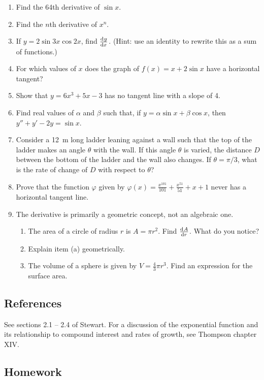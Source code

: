 \begin{enumerate}
  \item Find the 64th derivative of $ \sin x $.
  \item Find the $ n$th derivative of $ x^n $.
  \item If $ y = 2\sin 3x \cos 2x $, find $ \od{y}{x} $. (Hint: use an identity to rewrite this as a sum of functions.)
  \item For which values of $ x $ does the graph of $ f(x) = x + 2\sin x $ have a horizontal tangent?
  \item Show that $ y = 6x^3 + 5x - 3 $ has no tangent line with a slope of 4.
  \item Find real values of $ \alpha $ and $ \beta $ such that, if $ y = \alpha \sin x + \beta \cos x $,
        then $ y'' + y' -2y = \sin x $.
  \item Consider a \SI{12}{\metre} long ladder leaning against a wall such that the top of the ladder makes an
        angle $ \theta $ with the wall. If this angle $ \theta $ is varied, the distance $ D $ between the bottom
        of the ladder and the wall also changes. If $ \theta = \pi/3 $, what is the rate of change of $ D $ with
        respect to $ \theta $?
  \item Prove that the function $ \varphi $ given by $ \varphi(x) = \frac{x^{101}}{101} + \frac{x^{51}}{51} + x + 1 $
        never has a horizontal tangent line.
  \item The derivative is primarily a geometric concept, not an algebraic one.
    \begin{enumerate}
      \item The area of a circle of radius $ r $ is $ A = \pi r^2 $. Find $ \od{A}{r} $. What do you notice?
      \item Explain item (a) geometrically.
      \item The volume of a sphere is given by $ V = \frac{4}{3} \pi r^3 $. Find an expression for the surface area.
    \end{enumerate}
\end{enumerate}

\subsection{References}
See sections 2.1 -- 2.4 of Stewart. For a discussion of the exponential function and its
relationship to compound interest and rates of growth, see Thompson chapter XIV.

\subsection{Homework}

